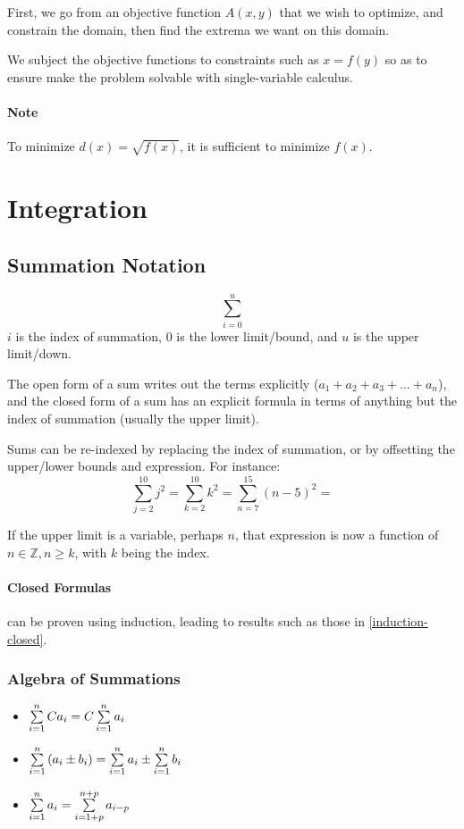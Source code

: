 \documentclass{article}
\begin{document}
First, we go from an objective function $A(x,y)$ that we wish to optimize, and constrain the domain, then find the extrema we want on this domain.

We subject the objective functions to constraints such as $x = f(y)$ so as to ensure make the problem solvable with single-variable calculus.

\paragraph{Note} To minimize $d(x) = \sqrt{f(x)}$, it is sufficient to minimize $f(x)$.

\section{Integration}
\subsection{Summation Notation}
$$\sum_{i=0}^{u}$$
$i$ is the index of summation, $0$ is the lower limit/bound, and $u$ is the upper limit/down.

The open form of a sum writes out the terms explicitly ($a_1 + a_2 + a_3 + \ldots + a_n$), and the closed form of a sum has an explicit formula in terms of anything but the index of summation (usually the upper limit).

Sums can be re-indexed by replacing the index of summation, or by offsetting the upper/lower bounds and expression. For instance:
$$\sum_{j=2}^{10} j^2 = \sum_{k=2}^{10} k^2 = \sum_{n=7}^{15} (n-5)^2 =$$

If the upper limit is a variable, perhaps $n$, that expression is now a function of $n \in \mathbb{Z}, n \ge k$, with $k$ being the index.

\paragraph{Closed Formulas}can be proven using induction, leading to results such as those in \ref{induction-closed}.

\subsubsection{Algebra of Summations}
\begin{itemize}
    \item $\sum_{i=1}^{n}\limits Ca_i = C\sum_{i=1}^{n}\limits a_i$
    \item $\sum_{i=1}^{n}\limits \left(a_i \pm b_i\right) = \sum_{i=1}^{n}\limits a_i \pm \sum_{i=1}^{n}\limits b_i$
    \item $\sum_{i=1}^{n}\limits a_i = \sum_{i=1+p}^{n+p}\limits a_{i-p}$
\end{itemize}
\end{document}
